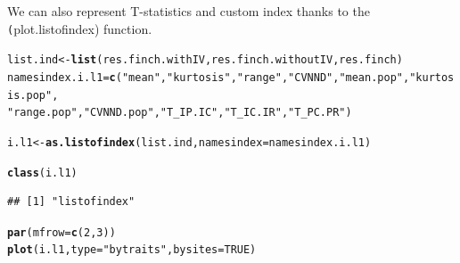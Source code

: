 \documentclass[12pt]{article}\usepackage[]{graphicx}\usepackage[]{color}
\makeatletter
\newcommand{\hlnum}[1]{\textcolor[rgb]{0.686,0.059,0.569}{#1}}%
\newcommand{\hlstr}[1]{\textcolor[rgb]{0.192,0.494,0.8}{#1}}%
\newcommand{\hlstd}[1]{\textcolor[rgb]{0.345,0.345,0.345}{#1}}%
\newcommand{\hlkwb}[1]{\textcolor[rgb]{0.69,0.353,0.396}{#1}}%
\newcommand{\hlkwc}[1]{\textcolor[rgb]{0.333,0.667,0.333}{#1}}%
\newcommand{\hlkwd}[1]{\textcolor[rgb]{0.737,0.353,0.396}{\textbf{#1}}}%
\newenvironment{kframe}{%
 \def\at@end@of@kframe{}%
 \ifinner\ifhmode%
  \def\at@end@of@kframe{\end{minipage}}%
  \begin{minipage}{\columnwidth}%
 \fi\fi%
 \def\FrameCommand##1{\hskip\@totalleftmargin \hskip-\fboxsep
 \colorbox{shadecolor}{##1}\hskip-\fboxsep
     \hskip-\linewidth \hskip-\@totalleftmargin \hskip\columnwidth}%
 \MakeFramed {\advance\hsize-\width
   \@totalleftmargin\z@ \linewidth\hsize
   \@setminipage}}%
 {\par\unskip\endMakeFramed%
 \at@end@of@kframe}
\newenvironment{knitrout}{}{} %
\newcommand{\code}[1]{{{\tt #1}}}
\makeatother
\begin{document}
\newpage

We can also represent T-statistics and custom index thanks to the \code(plot.listofindex) function.
\begin{knitrout}
\color{fgcolor}\begin{kframe}
\begin{alltt}
\hlstd{list.ind} \hlkwb{<-} \hlkwd{list}\hlstd{(res.finch.withIV, res.finch.withoutIV, res.finch)}
\hlstd{namesindex.i.l1} \hlkwb{=} \hlkwd{c}\hlstd{(}\hlstr{"mean"}\hlstd{,} \hlstr{"kurtosis"}\hlstd{,} \hlstr{"range"}\hlstd{,} \hlstr{"CVNND"}\hlstd{,} \hlstr{"mean.pop"}\hlstd{,} \hlstr{"kurtosis.pop"}\hlstd{,}
    \hlstr{"range.pop"}\hlstd{,} \hlstr{"CVNND.pop"}\hlstd{,} \hlstr{"T_IP.IC"}\hlstd{,} \hlstr{"T_IC.IR"}\hlstd{,} \hlstr{"T_PC.PR"}\hlstd{)}

\hlstd{i.l1} \hlkwb{<-} \hlkwd{as.listofindex}\hlstd{(list.ind,} \hlkwc{namesindex} \hlstd{= namesindex.i.l1)}

\hlkwd{class}\hlstd{(i.l1)}
\end{alltt}
\begin{verbatim}
## [1] "listofindex"
\end{verbatim}
\begin{alltt}
\hlkwd{par}\hlstd{(}\hlkwc{mfrow} \hlstd{=} \hlkwd{c}\hlstd{(}\hlnum{2}\hlstd{,} \hlnum{3}\hlstd{))}
\hlkwd{plot}\hlstd{(i.l1,} \hlkwc{type} \hlstd{=} \hlstr{"bytraits"}\hlstd{,} \hlkwc{bysites} \hlstd{=} \hlnum{TRUE}\hlstd{)}
\end{alltt}



\end{kframe}
\end{knitrout}
\end{document}
